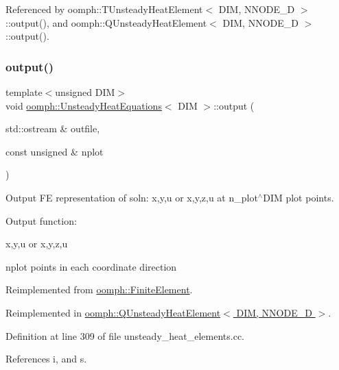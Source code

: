 Referenced by oomph\+::\+T\+Unsteady\+Heat\+Element$<$ D\+I\+M, N\+N\+O\+D\+E\+\_\+D $>$\+::output(), and oomph\+::\+Q\+Unsteady\+Heat\+Element$<$ D\+I\+M, N\+N\+O\+D\+E\+\_\+D $>$\+::output().

\mbox{\label{classoomph_1_1UnsteadyHeatEquations_a68794ad133c4a06bed09488cc7cd5e94}} 
\subsubsection{\texorpdfstring{output()}{output()}\hspace{0.1cm}{\footnotesize\ttfamily [2/4]}}
{\footnotesize\ttfamily template$<$unsigned D\+IM$>$ \\
void \hyperlink{classoomph_1_1UnsteadyHeatEquations}{oomph\+::\+Unsteady\+Heat\+Equations}$<$ D\+IM $>$\+::output (\begin{DoxyParamCaption}\item[{std\+::ostream \&}]{outfile,  }\item[{const unsigned \&}]{nplot }\end{DoxyParamCaption})\hspace{0.3cm}{\ttfamily [virtual]}}



Output FE representation of soln\+: x,y,u or x,y,z,u at n\+\_\+plot$^\wedge$\+D\+IM plot points. 

Output function\+:

x,y,u or x,y,z,u

nplot points in each coordinate direction 

Reimplemented from \hyperlink{classoomph_1_1FiniteElement_afa9d9b2670f999b43e6679c9dd28c457}{oomph\+::\+Finite\+Element}.



Reimplemented in \hyperlink{classoomph_1_1QUnsteadyHeatElement_ae54ed4ee8b36659f7498a4bef75f35c2}{oomph\+::\+Q\+Unsteady\+Heat\+Element$<$ D\+I\+M, N\+N\+O\+D\+E\+\_\+D $>$}.



Definition at line 309 of file unsteady\+\_\+heat\+\_\+elements.\+cc.



References i, and s.

\mbox{\label{classoomph_1_1UnsteadyHeatEquations_a1e8bd563df8386a5935be50dc5d3d640}} 
